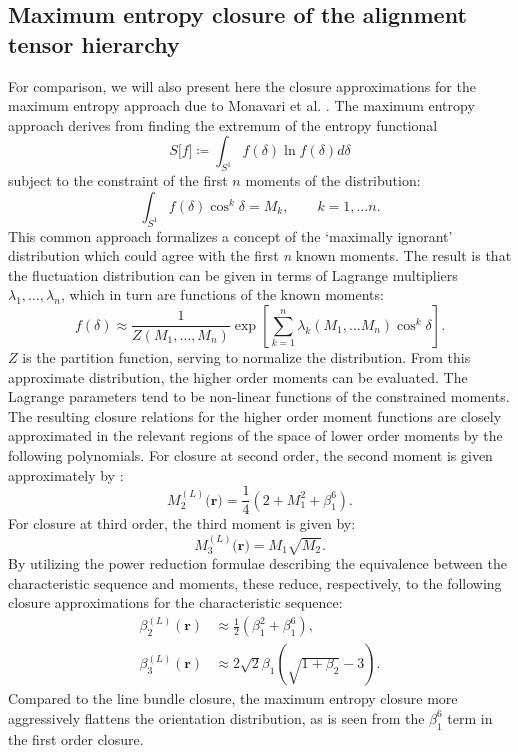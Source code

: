 \subsection{Maximum entropy closure of the alignment tensor
hierarchy}
For comparison, we will also present here the closure approximations for the maximum entropy approach due to Monavari et al. \cite{Monavari2016}. The maximum entropy approach derives from finding the extremum of the entropy functional
\begin{equation}S\lbrack f\rbrack \coloneqq \int_{S^{1}}^{}{f(\delta)\ln{f(\delta)}d\delta}\end{equation}
subject to the constraint of the first \(n\) moments of the
distribution:
\begin{equation}
\int_{S^{1}}^{}{f(\delta)\cos^{k}\delta} = M_{k},\qquad k = 1,\ldots n.
\end{equation}
This common approach formalizes a concept of the `maximally ignorant' distribution which could agree with the first \emph{n} known moments. The result is that the fluctuation distribution can be given in terms of Lagrange multipliers $\lambda_{1}, \dots, \lambda_n$, which in turn are functions of the known moments:
\begin{equation}
f(\delta) \approx \frac{1}{Z\left( M_{1},\ldots,M_{n} \right)}\exp{\left\lbrack {\sum_{k = 1}^{n}{\lambda_{k}\left( M_{1},\ldots M_{n} \right)}\cos^{k}}\delta \right\rbrack.}
\end{equation}
$Z$ is the partition function, serving to normalize the distribution. From this approximate distribution, the higher order moments can be evaluated. The Lagrange parameters tend to be non-linear functions of the constrained moments. The resulting closure relations for the higher order moment functions are closely approximated in the relevant regions of the space of lower order moments by the following polynomials. For closure at second order, the second moment is given approximately by \cite{Monavari2016}:
\begin{equation}
M_{2}^{(L)}(\boldsymbol{r)} = \frac{1}{4}\left( 2 + M_{1}^{2} + \beta_{1}^{6} \right).
\end{equation}
For closure at third order, the third moment is given by:
\begin{equation}M_{3}^{(L)}(\boldsymbol{r)} = M_{1}\sqrt{M_{2}}.\end{equation}
By utilizing the power reduction formulae describing the equivalence between the characteristic sequence and moments, these reduce, respectively, to the following closure approximations for the characteristic sequence:
\begin{align}
\beta_{2}^{(L)}\left( \boldsymbol{r} \right) &\approx \frac{1}{2}\left( \beta_1^2 + \beta_{1}^{6} \right),   \label{eq:ME1} \\
\beta_{3}^{(L)}\left( \boldsymbol{r} \right) &\approx 2\sqrt{2}\beta_{1}\left( \sqrt{1 + \beta_{2}} - 3 \right).\label{eq:ME2}
\end{align}
Compared to the line bundle closure, the maximum entropy closure more aggressively flattens the orientation distribution, as is seen from the $\beta_1^6$ term in the first order closure.

